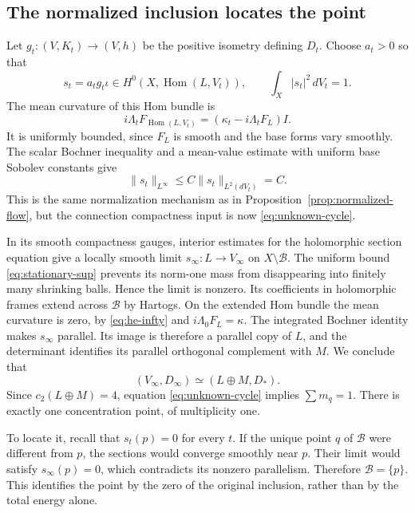 \documentclass[11pt]{amsart}
\theoremstyle{definition}
\theoremstyle{remark}
\newcommand{\Hom}{\operatorname{Hom}}
\begin{document}
\subsection{The normalized inclusion locates the point}
Let $g_t:(V,K_t)\to(V,h)$ be the positive isometry defining $D_t$.
Choose $a_t>0$ so that
\begin{equation}\label{eq:stationary-sections}
 s_t=a_tg_t\iota\in H^0(X,\Hom(L,V_t)),
 \qquad\int_X|s_t|^2\,dV_t=1.
\end{equation}
The mean curvature of this Hom bundle is
\[
 i\Lambda_tF_{\Hom(L,V_t)}
       =(\kappa_t-i\Lambda_tF_L)I.
\]
It is uniformly bounded, since $F_L$ is smooth and the base forms vary
smoothly. The scalar Bochner inequality and a mean-value estimate with
uniform base Sobolev constants give
\begin{equation}\label{eq:stationary-sup}
 \|s_t\|_{L^\infty}\le C\|s_t\|_{L^2(dV_t)}=C.
\end{equation}
This is the same normalization mechanism as in
Proposition~\ref{prop:normalized-flow}, but the connection compactness
input is now \eqref{eq:unknown-cycle}.

In its smooth compactness gauges, interior estimates for the holomorphic
section equation give a locally smooth limit
$s_\infty:L\to V_\infty$ on $X\setminus\mathcal B$. The uniform bound
\eqref{eq:stationary-sup} prevents its norm-one mass from disappearing
into finitely many shrinking balls. Hence the limit is nonzero.
Its coefficients in holomorphic frames extend across $\mathcal B$ by Hartogs.
On the extended Hom bundle the mean curvature is zero, by
\eqref{eq:he-infty} and $i\Lambda_0F_L=\kappa$. The integrated Bochner
identity makes $s_\infty$ parallel. Its image is therefore a parallel
copy of $L$, and the determinant identifies its parallel orthogonal
complement with $M$. We conclude that
\begin{equation}\label{eq:identified-limit}
 (V_\infty,D_\infty)\simeq(L\oplus M,D_*).
\end{equation}
Since $c_2(L\oplus M)=4$, equation \eqref{eq:unknown-cycle} implies
$\sum m_q=1$. There is exactly one concentration point, of multiplicity one.

To locate it, recall that $s_t(p)=0$ for every $t$. If the unique point
$q$ of $\mathcal B$ were different from $p$, the sections would converge
smoothly near $p$. Their limit would satisfy $s_\infty(p)=0$, which
contradicts its nonzero parallelism. Therefore $\mathcal B=\{p\}$.
This identifies the point by the zero of the original inclusion, rather
than by the total energy alone.
\end{document}
